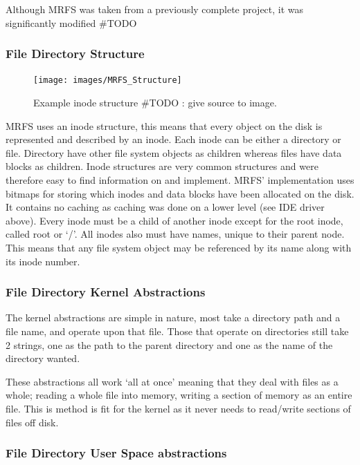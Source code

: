 \documentclass[a4paper]{report}
\begin{document}
Although MRFS was taken from a previously complete project, it was significantly modified #TODO

\subsubsection{File Directory Structure}

\begin{figure}[ht]
\centering
\texttt{[image: images/MRFS\_Structure]}
\caption{Example inode structure #TODO : give source to image.}
\label{fig:WinTitleBarScreen}
\end{figure}


MRFS uses an inode structure, this means that every object on the disk is represented and described by an inode. Each inode can be either a directory or file. Directory have other file system objects as children whereas files have data blocks as children. Inode structures are very common structures and were therefore easy to find information on and implement. MRFS' implementation uses bitmaps for storing which inodes and data blocks have been allocated on the disk. It contains no caching as caching was done on a lower level (see IDE driver above). Every inode must be a child of another inode except for the root inode, called root or `/'. All inodes also must have names, unique to their parent node. This means that any file system object may be referenced by its name along with its inode number.

\subsubsection{File Directory Kernel Abstractions}

The kernel abstractions are simple in nature, most take a directory path and a file name, and operate upon that file. Those that operate on directories still take 2 strings, one as the path to the parent directory and one as the name of the directory wanted.

These abstractions all work `all at once' meaning that they deal with files as a whole; reading a whole file into memory, writing a section of memory as an entire file. This is method is fit for the kernel as it never needs to read/write sections of files off disk.

\subsubsection{File Directory User Space abstractions}
\end{document}
